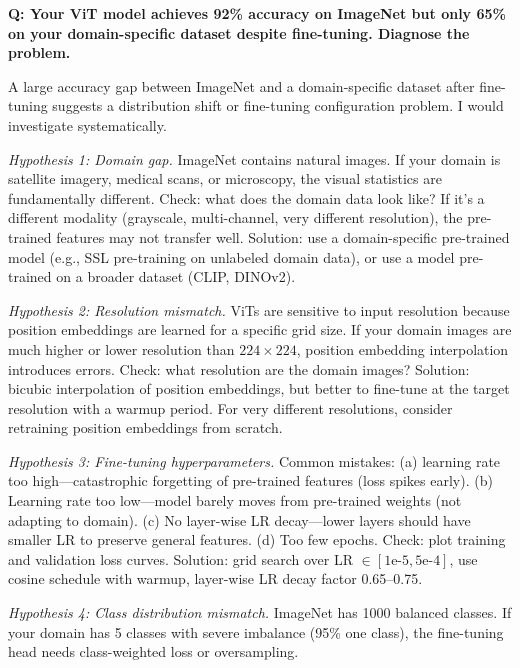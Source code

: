 \begin{interviewq}
\textbf{Q: Your ViT model achieves 92\% accuracy on ImageNet but only 65\% on your domain-specific dataset despite fine-tuning. Diagnose the problem.}

 \quad {} \quad \badgefreq{\freqmed}

\stronganswer A large accuracy gap between ImageNet and a domain-specific dataset after fine-tuning suggests a distribution shift or fine-tuning configuration problem. I would investigate systematically.

\textit{Hypothesis 1: Domain gap.} ImageNet contains natural images. If your domain is satellite imagery, medical scans, or microscopy, the visual statistics are fundamentally different. Check: what does the domain data look like? If it's a different modality (grayscale, multi-channel, very different resolution), the pre-trained features may not transfer well. Solution: use a domain-specific pre-trained model (e.g., SSL pre-training on unlabeled domain data), or use a model pre-trained on a broader dataset (CLIP, DINOv2).

\textit{Hypothesis 2: Resolution mismatch.} ViTs are sensitive to input resolution because position embeddings are learned for a specific grid size. If your domain images are much higher or lower resolution than $224 \times 224$, position embedding interpolation introduces errors. Check: what resolution are the domain images? Solution: bicubic interpolation of position embeddings, but better to fine-tune at the target resolution with a warmup period. For very different resolutions, consider retraining position embeddings from scratch.

\textit{Hypothesis 3: Fine-tuning hyperparameters.} Common mistakes: (a) learning rate too high---catastrophic forgetting of pre-trained features (loss spikes early). (b) Learning rate too low---model barely moves from pre-trained weights (not adapting to domain). (c) No layer-wise LR decay---lower layers should have smaller LR to preserve general features. (d) Too few epochs. Check: plot training and validation loss curves. Solution: grid search over LR $\in [1\text{e-}5, 5\text{e-}4]$, use cosine schedule with warmup, layer-wise LR decay factor 0.65--0.75.

\textit{Hypothesis 4: Class distribution mismatch.} ImageNet has 1000 balanced classes. If your domain has 5 classes with severe imbalance (95\% one class), the fine-tuning head needs class-weighted loss or oversampling.


\end{interviewq}
